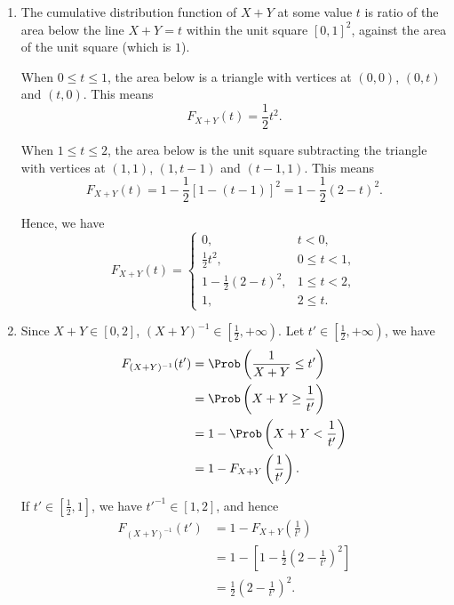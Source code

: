 \Question{\currfilebase}

\begin{enumerate}
    \item The cumulative distribution function of \(X + Y\) at some value \(t\) is ratio of the area below the line \(X + Y = t\) within the unit square \([0, 1]^2\), against the area of the unit square (which is \(1\)).

          When \(0 \leq t \leq 1\), the area below is a triangle with vertices at \((0, 0)\), \((0, t)\) and \((t, 0)\). This means
          \[
              F_{X + Y}(t) = \frac{1}{2}t^2.
          \]

          When \(1 \leq t \leq 2\), the area below is the unit square subtracting the triangle with vertices at \((1, 1)\), \((1, t - 1)\) and \((t - 1, 1)\). This means
          \[
              F_{X + Y}(t) = 1 - \frac{1}{2}[1 - (t - 1)]^2 = 1 - \frac{1}{2} (2 - t)^2.
          \]

          Hence, we have
          \[
              F_{X + Y}(t) =
              \begin{cases}
                  0,                         & t < 0,        \\
                  \frac{1}{2} t^2,           & 0 \leq t < 1, \\
                  1 - \frac{1}{2} (2 - t)^2, & 1 \leq t < 2, \\
                  1,                         & 2 \leq t.
              \end{cases}
          \]

    \item Since \(X + Y \in [0, 2]\), \((X + Y)^{-1} \in \left[\frac{1}{2}, +\infty\right)\). Let \(t' \in \left[\frac{1}{2}, +\infty\right)\), we have
          \begin{align*}
              F_{(X + Y)^{-1}}(t') & = \Prob\left(\frac{1}{X + Y} \leq t'\right)  \\
                                   & = \Prob\left(X + Y \geq \frac{1}{t'}\right)  \\
                                   & = 1 - \Prob\left(X + Y < \frac{1}{t'}\right) \\
                                   & = 1 - F_{X + Y}\left(\frac{1}{t'}\right).
          \end{align*}

          If \(t' \in \left[\frac{1}{2}, 1\right]\), we have \(t'^{-1} \in [1, 2]\), and hence
          \begin{align*}
              F_{(X + Y)^{-1}}(t') & = 1 - F_{X + Y}\left(\frac{1}{t'}\right)                           \\
                                   & = 1 - \left[1 - \frac{1}{2} \left(2 - \frac{1}{t'}\right)^2\right] \\
                                   & = \frac{1}{2} \left(2 - \frac{1}{t'}\right)^2.
          \end{align*}


\end{enumerate}
